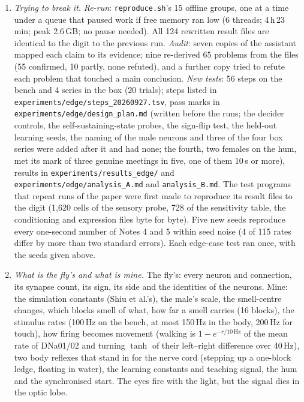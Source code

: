 \documentclass[11pt,a4paper]{article}
\begin{document}
\begin{enumerate}[leftmargin=*, label=\arabic*., itemsep=4pt]
\item \emph{Trying to break it.} \emph{Re-run}: \texttt{reproduce.sh}'s 15 offline groups, one at a time under a queue that paused work if free memory ran low (6 threads; 4\,h\,23\,min; peak 2.6\,GB; no pause needed). All 124 rewritten result files are identical to the digit to the previous run. \emph{Audit}: seven copies of the assistant mapped each claim to its evidence; nine re-derived 65 problems from the files (55 confirmed, 10 partly, none refuted), and a further copy tried to refute each problem that touched a main conclusion. \emph{New tests}: 56 steps on the bench and 4 series in the box (20 trials); steps listed in \texttt{experiments/edge/steps\_20260927.tsv}, pass marks in \texttt{experiments/edge/design\_plan.md} (written before the runs; the decider controls, the self-sustaining-state probes, the sign-flip test, the held-out learning seeds, the naming of the male neurons and three of the four box series were added after it and had none; the fourth, two females on the hum, met its mark of three genuine meetings in five, one of them 10\,s or more), results in \texttt{experiments/results\_edge/} and \texttt{experiments/edge/analysis\_A.md} and \texttt{analysis\_B.md}. The test programs that repeat runs of the paper were first made to reproduce its result files to the digit (1{,}620 cells of the sensory probe, 728 of the sensitivity table, the conditioning and expression files byte for byte). Five new seeds reproduce every one-second number of Notes 4 and 5 within seed noise (4 of 115 rates differ by more than two standard errors). Each edge-case test ran once, with the seeds given above.

\item \emph{What is the fly's and what is mine.} The fly's: every neuron and connection, its synapse count, its sign, its side and the identities of the neurons. Mine: the simulation constants (Shiu et al.'s), the male's scale, the smell-centre changes, which blocks smell of what, how far a smell carries (16 blocks), the stimulus rates (100\,Hz on the bench, at most 150\,Hz in the body, 200\,Hz for touch), how firing becomes movement (walking is $1-e^{-r/10\,\text{Hz}}$ of the mean rate of DNa01/02 and turning $\tanh$ of their left--right difference over 40\,Hz), two body reflexes that stand in for the nerve cord (stepping up a one-block ledge, floating in water), the learning constants and teaching signal, the hum and the synchronised start. The eyes fire with the light, but the signal dies in the optic lobe.

\end{enumerate}
\end{document}
